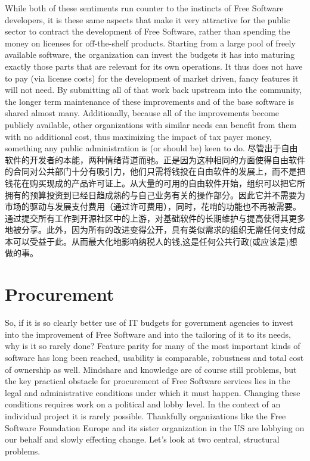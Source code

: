 While both of these sentiments run counter to the instincts of Free Software
developers, it is these same aspects that make it very attractive for the
public sector to contract the development of Free Software, rather than
spending the money on licenses for off-the-shelf products. Starting from a
large pool of freely available software, the organization can invest the
budgets it has into maturing exactly those parts that are relevant for its own
operations. It thus does not have to pay (via license costs) for the development of
market driven, fancy features it will not need. By submitting all of that work
back upstream into the community, the longer term maintenance of these
improvements and of the base software is shared almost many. Additionally,
because all of the improvements become publicly available, other
organizations with similar needs can benefit from them with no
additional cost, thus maximizing the impact of tax payer money,
something any public administration is (or should be) keen to do.
尽管出于自由软件的开发者的本能，两种情绪背道而驰。正是因为这种相同的方面使得自由软件的合同对公共部门十分有吸引力，他们只需将钱投在自由软件的发展上，而不是把钱花在购买现成的产品许可证上。从大量的可用的自由软件开始，组织可以把它所拥有的预算投资到已经日趋成熟的与自己业务有关的操作部分。因此它并不需要为市场的驱动与发展支付费用（通过许可费用），同时，花哨的功能也不再被需要。通过提交所有工作到开源社区中的上游，对基础软件的长期维护与提高使得其更多地被分享。此外，因为所有的改进变得公开，具有类似需求的组织无需任何支付成本可以受益于此。从而最大化地影响纳税人的钱,这是任何公共行政(或应该是)想做的事。

\section*{Procurement}

So, if it is so clearly better use of IT budgets for government agencies to invest
into the improvement of Free Software and into the tailoring of it to its needs, why is it
so rarely done? Feature parity for many of the most important kinds of software has
long been reached, usability is comparable, robustness and total cost of ownership
as well. Mindshare and knowledge are of course still problems, but the key practical obstacle
for procurement of Free Software services lies in the legal and administrative
conditions under which it must happen. Changing these conditions requires work
on a political and lobby level. In the context of an individual project it is
rarely possible. Thankfully organizations like the Free Software Foundation Europe and
its sister organization in the US are lobbying on our behalf and slowly effecting
change. Let's look at two central, structural problems.

